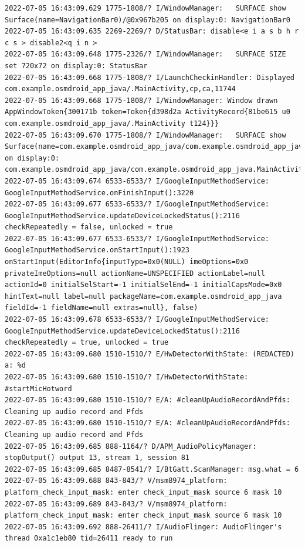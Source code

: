 \documentclass[a4paper,12pt]{book}
\begin{document}
\begin{lstlisting}
2022-07-05 16:43:09.629 1775-1808/? I/WindowManager:   SURFACE show Surface(name=NavigationBar0)/@0x967b205 on display:0: NavigationBar0
2022-07-05 16:43:09.635 2269-2269/? D/StatusBar: disable<e i a s b h r c s > disable2<q i n >
2022-07-05 16:43:09.648 1775-2326/? I/WindowManager:   SURFACE SIZE set 720x72 on display:0: StatusBar
2022-07-05 16:43:09.668 1775-1808/? I/LaunchCheckinHandler: Displayed com.example.osmdroid_app_java/.MainActivity,cp,ca,11744
2022-07-05 16:43:09.668 1775-1808/? I/WindowManager: Window drawn AppWindowToken{300171b token=Token{d398d2a ActivityRecord{81be615 u0 com.example.osmdroid_app_java/.MainActivity t124}}}
2022-07-05 16:43:09.670 1775-1808/? I/WindowManager:   SURFACE show Surface(name=com.example.osmdroid_app_java/com.example.osmdroid_app_java.MainActivity)/@0xdf1cbd on display:0: com.example.osmdroid_app_java/com.example.osmdroid_app_java.MainActivity
2022-07-05 16:43:09.674 6533-6533/? I/GoogleInputMethodService: GoogleInputMethodService.onFinishInput():3220 
2022-07-05 16:43:09.677 6533-6533/? I/GoogleInputMethodService: GoogleInputMethodService.updateDeviceLockedStatus():2116 checkRepeatedly = false, unlocked = true
2022-07-05 16:43:09.677 6533-6533/? I/GoogleInputMethodService: GoogleInputMethodService.onStartInput():1923 onStartInput(EditorInfo{inputType=0x0(NULL) imeOptions=0x0 privateImeOptions=null actionName=UNSPECIFIED actionLabel=null actionId=0 initialSelStart=-1 initialSelEnd=-1 initialCapsMode=0x0 hintText=null label=null packageName=com.example.osmdroid_app_java fieldId=-1 fieldName=null extras=null}, false)
2022-07-05 16:43:09.678 6533-6533/? I/GoogleInputMethodService: GoogleInputMethodService.updateDeviceLockedStatus():2116 checkRepeatedly = true, unlocked = true
2022-07-05 16:43:09.680 1510-1510/? E/HwDetectorWithState: (REDACTED) a: %d
2022-07-05 16:43:09.680 1510-1510/? I/HwDetectorWithState: #startMicHotword
2022-07-05 16:43:09.680 1510-1510/? E/A: #cleanUpAudioRecordAndPfds: Cleaning up audio record and Pfds
2022-07-05 16:43:09.680 1510-1510/? E/A: #cleanUpAudioRecordAndPfds: Cleaning up audio record and Pfds
2022-07-05 16:43:09.685 888-1164/? D/APM_AudioPolicyManager: stopOutput() output 13, stream 1, session 81
2022-07-05 16:43:09.685 8487-8541/? I/BtGatt.ScanManager: msg.what = 6
2022-07-05 16:43:09.688 843-843/? V/msm8974_platform: platform_check_input_mask: enter check_input_mask source 6 mask 10
2022-07-05 16:43:09.689 843-843/? V/msm8974_platform: platform_check_input_mask: enter check_input_mask source 6 mask 10
2022-07-05 16:43:09.692 888-26411/? I/AudioFlinger: AudioFlinger's thread 0xa1c1eb80 tid=26411 ready to run

\end{lstlisting}
\end{document}
